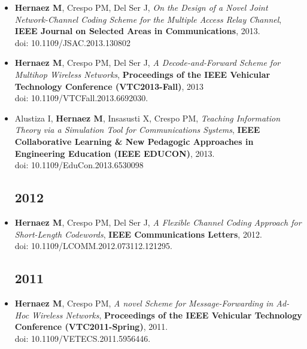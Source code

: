\documentclass[11pt,a4paper,sans]{moderncv}        %
\begin{document}
\begin{itemize}
\item \textbf{Hernaez M}, Crespo PM, {Del Ser} J, \textsl{ On the Design of a Novel Joint Network-Channel Coding Scheme for the Multiple Access Relay Channel}, \textbf{IEEE Journal on Selected Areas in Communications}, 2013.\\
doi: 10.1109/JSAC.2013.130802\\

\item \textbf{Hernaez M}, Crespo PM, {Del Ser} J, \textsl{A Decode-and-Forward Scheme for Multihop Wireless Networks}, \textbf{Proceedings of the IEEE Vehicular Technology Conference (VTC2013-Fall)}, 2013\\
doi: 10.1109/VTCFall.2013.6692030.\\

\item Alustiza I, \textbf{Hernaez M}, Insasusti X, Crespo PM, \textsl{Teaching Information Theory via a Simulation Tool for Communications Systems}, \textbf{IEEE Collaborative Learning \& New Pedagogic Approaches in Engineering Education (IEEE EDUCON)}, 2013.\\
doi: 10.1109/EduCon.2013.6530098\\

\subsection{2012}
\vspace{6pt}

\item \textbf{Hernaez M}, Crespo PM, {Del Ser} J, \textsl{A Flexible Channel Coding Approach for Short-Length Codewords}, \textbf{IEEE Communications Letters}, 2012.\\
doi: 10.1109/LCOMM.2012.073112.121295.\\

\subsection{2011}
\vspace{6pt}

\item \textbf{Hernaez M}, Crespo PM, \textsl{A novel Scheme for Message-Forwarding in Ad-Hoc Wireless Networks}, \textbf{Proceedings of the IEEE Vehicular Technology Conference (VTC2011-Spring)}, 2011.\\
doi: 10.1109/VETECS.2011.5956446.\\


\end{itemize}
\end{document}
